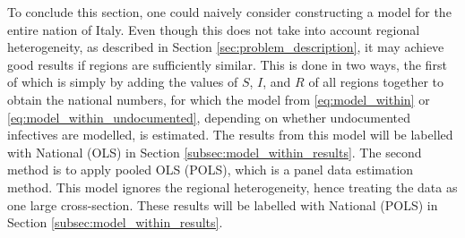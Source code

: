\documentclass[12pt]{article}
\begin{document}
	
	
	To conclude this section, one could naively consider constructing a model for the entire nation of Italy. Even though this does not take into account regional heterogeneity, as described in Section \ref{sec:problem_description}, it may achieve good results if regions are sufficiently similar. This is done in two ways, the first of which is simply by adding the values of $S$, $I$, and $R$ of all regions together to obtain the national numbers, for which the model from \eqref{eq:model_within} or \eqref{eq:model_within_undocumented}, depending on whether undocumented infectives are modelled, is estimated. The results from this model will be labelled with National (OLS) in Section \ref{subsec:model_within_results}. The second method is to apply pooled OLS (POLS), which is a panel data estimation method. This model ignores the regional heterogeneity, hence treating the data as one large cross-section. These results will be labelled with National (POLS) in Section \ref{subsec:model_within_results}.
	
\end{document}
